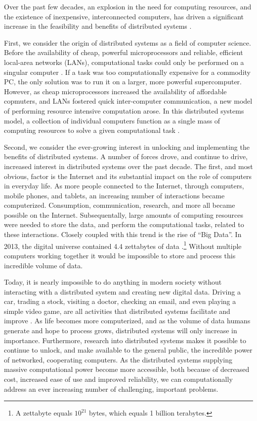 Over the past few decades, an explosion in the need for computing resources,
and the existence of inexpensive, interconnected computers, has
driven a significant increase in the feasibility and benefits of distributed
systems \cite{distributed-systems-principles-and-paradigms}.

First, we consider the origin of distributed systems as a field of computer
science. Before the availability of cheap, powerful microprocessors and reliable,
efficient local-area networks (LANs), computational tasks could only be
performed on a singular computer
\cite{distributed-systems-principles-and-paradigms}. If a task was too
computationally expensive for a commodity PC, the only solution was to run
it on a larger, more powerful supercomputer. However, as cheap microprocessors
increased the availability of affordable copmuters, and LANs fostered quick inter-computer
communication, a new
model of performing resource intensive computation arose.
In this distributed systems model, a collection of individual
computers function as a single mass of computing resources
to solve a given computational task
\cite{distributed-systems-principles-and-paradigms}.

Second, we consider the ever-growing interest in unlocking and implementing the
benefits of distributed systems. A number of forces drove, and continue to drive,
increased interest in distributed systems over
the past decade. The first, and most obvious, factor is the Internet and its
substantial impact on the role of computers in everyday life.
As more people connected to the Internet, through computers,
mobile phones, and tablets, an increasing number of interactions became
computerized. Consumption, communication, research, and more all
became possible on the Internet. Subsequentally, large amounts of computing resources
were needed to store the data, and perform the computational tasks, related to these
interactions. Closely coupled with this trend is the rise of ``Big Data''.
In 2013, the digital universe contained 4.4 zettabytes of data
\cite{the-digital-universe-of-opportunities}.\footnote{A
  zettabyte equals $10^{21}$ bytes, which equals 1 billion
terabytes.} Without
multiple computers working together it would be impossible to store and process
this incredible volume of data.

Today, it is nearly impossible to do
anything in modern society without interacting with a distributed system and
creating new digital data. Driving a car, trading a stock, visiting a doctor,
checking an email, and even playing a simple video game, are all activities that
distributed systems facilitate and improve \cite{distributed-systems-concepts-and-design}.
As life becomes more
computerized, and as the volume of data humans generate and hope to process
grows, distributed systems will only increase in importance.
Furthermore, research into distributed systems makes it possible to
continue to unlock, and make available to the general public,
the incredible power of networked, cooperating computers. As the distributed systems
supplying massive computational power become more
accessible, both because of decreased cost, increased ease of use and
improved reliability, we can
computationally address an ever increasing number of challenging, important problems.

